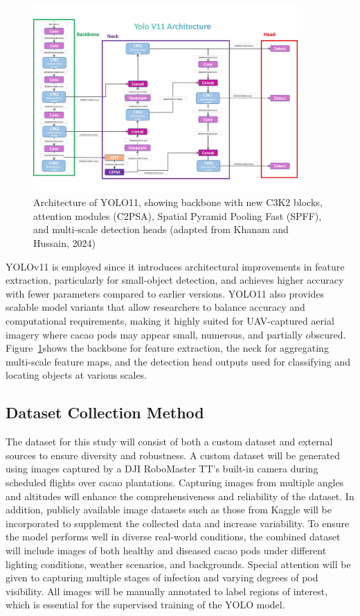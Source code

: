 \begin{figure}[H]
	\centering
	\caption{Architecture of YOLO11, showing backbone with new C3K2 blocks, attention modules (C2PSA), Spatial Pyramid Pooling Fast (SPFF), and multi-scale detection heads (adapted from Khanam and Hussain, 2024)}
	\label{fig:yolov11_architecture}
	\includegraphics[width=0.9\textwidth]{figures/yolov11.pdf}
\end{figure}

YOLOv11 is employed since it introduces architectural improvements in feature extraction, particularly for small-object detection, and achieves higher accuracy with fewer parameters compared to earlier versions. YOLO11 also provides scalable model variants that allow researchers to balance accuracy and computational requirements, making it highly suited for UAV-captured aerial imagery where cacao pods may appear small, numerous, and partially obscured. Figure~\ref{fig:yolov11_architecture}shows the  backbone for feature extraction, the neck for aggregating multi-scale feature maps, and the detection head outputs used for classifying and locating objects at various scales.

\subsection{Dataset Collection Method}
The dataset for this study will consist of both a custom dataset and external sources to ensure diversity and robustness. A custom dataset will be generated using images captured by a DJI RoboMaster TT’s built-in camera during scheduled flights over cacao plantations. Capturing images from multiple angles and altitudes will enhance the comprehensiveness and reliability of the dataset. In addition, publicly available image datasets such as those from Kaggle will be incorporated to supplement the collected data and increase variability. To ensure the model performs well in diverse real-world conditions, the combined dataset will include images of both healthy and diseased cacao pods under different lighting conditions, weather scenarios, and backgrounds. Special attention will be given to capturing multiple stages of infection and varying degrees of pod visibility. All images will be manually annotated to label regions of interest, which is essential for the supervised training of the YOLO model.

